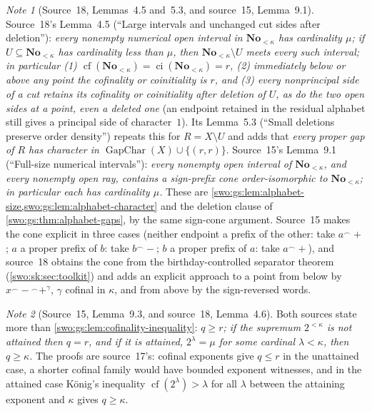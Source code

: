 \documentclass[11pt]{article}
\theoremstyle{definition}
\theoremstyle{remark}
\newtheorem{note}[note]{Note}
\newcommand{\No}{\mathbf{No}}
\newcommand{\cf}{\operatorname{cf}}
\newcommand{\cat}{\mathbin{{}^\frown}}
\newcommand{\ci}{\operatorname{ci}}
\newcommand{\GapChar}{\operatorname{GapChar}}
\begin{document}
\begin{note}[Source~18, Lemmas~4.5 and~5.3, and source~15, Lemma~9.1]\label{swo:sh:lem:new-residual-alphabet}\label{swo:sh:lem:gap-small-deletion}\label{swo:cb:new:lem:full-size-intervals}
Source~18's Lemma~4.5 (``Large intervals and unchanged cut sides after
deletion''): \emph{every nonempty numerical open interval in $\No_{<\kappa}$
has cardinality $\mu$; if $U\subseteq\No_{<\kappa}$ has cardinality less than
$\mu$, then $\No_{<\kappa}\setminus U$ meets every such interval; in
particular (1) $\cf(\No_{<\kappa})=\ci(\No_{<\kappa})=r$, (2) immediately below
or above any point the cofinality or coinitiality is $r$, and (3) every
nonprincipal side of a cut retains its cofinality or coinitiality after
deletion of $U$, as do the two open sides at a point, even a deleted one}
(an endpoint retained in the residual alphabet still gives a principal side
of character~$1$). Its Lemma~5.3 (``Small deletions preserve order
density'') repeats this for $R=X\setminus U$ and adds that \emph{every proper
gap of $R$ has character in $\GapChar(X)\cup\{(r,r)\}$}. Source~15's Lemma~9.1
(``Full-size numerical intervals''): \emph{every nonempty open interval of
$\No_{<\kappa}$, and every nonempty open ray, contains a sign-prefix cone
order-isomorphic to $\No_{<\kappa}$; in particular each has cardinality $\mu$.}
These are \cref{swo:gs:lem:alphabet-size,swo:gs:lem:alphabet-character} and the
deletion clause of \cref{swo:gs:thm:alphabet-gaps}, by the same sign-cone
argument. Source~15 makes the cone explicit in three cases (neither endpoint a
prefix of the other: take $a\cat+$; $a$ a proper prefix of $b$: take
$b\cat-$; $b$ a proper prefix of $a$: take $a\cat+$), and source~18 obtains
the cone from the birthday-controlled separator theorem
(\cref{swo:sk:sec:toolkit}) and adds an explicit approach to a point from
below by $x\cat-\cat+^\gamma$, $\gamma$ cofinal in $\kappa$, and from above by
the sign-reversed words.
\end{note}

\begin{note}[Source~15, Lemma~9.3, and source~18, Lemma~4.6]\label{swo:cb:new:lem:power-sup-cofinality}\label{swo:sh:lem:new-cardinal-cofinalities}
Both sources state more than \cref{swo:gs:lem:cofinality-inequality}:
\emph{$q\geq r$; if the supremum $2^{<\kappa}$ is not attained then $q=r$, and
if it is attained, $2^\lambda=\mu$ for some cardinal $\lambda<\kappa$, then
$q\geq\kappa$.} The proofs are source~17's: cofinal exponents give $q\le r$ in
the unattained case, a shorter cofinal family would have bounded exponent
witnesses, and in the attained case K\"onig's inequality
$\cf(2^\lambda)>\lambda$ for all $\lambda$ between the attaining exponent and
$\kappa$ gives $q\ge\kappa$.
\end{note}
\end{document}
